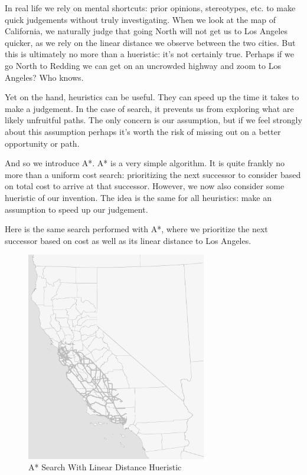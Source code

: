 \documentclass[12pt]{article}
\begin{document}
In real life we rely on mental shortcuts: prior opinions, stereotypes, etc. to make quick judgements without truly investigating. When we look at the map of California, we naturally judge that going North will not get us to Los Angeles quicker, as we rely on the linear distance we observe between the two cities. But this is ultimately no more than a hueristic: it's not certainly true. Perhaps if we go North to Redding we can get on an uncrowded highway and zoom to Los Angeles? Who knows.

Yet on the hand, heuristics can be useful. They can speed up the time it takes to make a judgement. In the case of search, it prevents us from exploring what are likely unfruitful paths. The only concern is our assumption, but if we feel strongly about this assumption perhaps it's worth the risk of missing out on a better opportunity or path.

And so we introduce A*. A* is a very simple algorithm. It is quite frankly no more than a uniform cost search: prioritizing the next successor to consider based on total cost to arrive at that successor. However, we now also consider some hueristic of our invention. The idea is the same for all heuristics: make an assumption to speed up our judgement.

Here is the same search performed with A*, where we prioritize the next successor based on cost as well as its linear distance to Los Angeles.

\begin{figure}[h]
    \centering
    \includegraphics[width=0.7\textwidth]{a-star.png}
    \caption{A* Search With Linear Distance Hueristic}
    \label{fig:a-star}
\end{figure}
\end{document}
